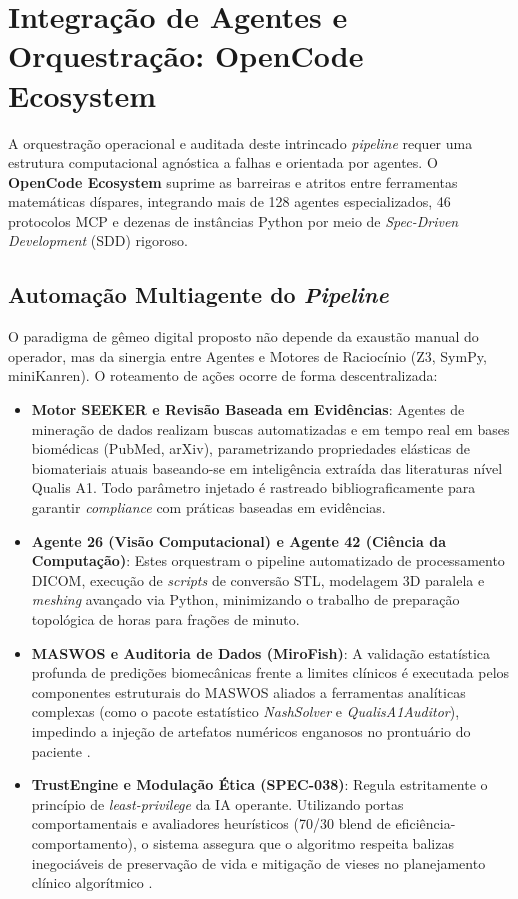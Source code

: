 \section{Integração de Agentes e Orquestração: OpenCode Ecosystem}
\label{sec:integracao}

A orquestração operacional e auditada deste intrincado \textit{pipeline} requer uma estrutura computacional agnóstica a falhas e orientada por agentes. O \textbf{OpenCode Ecosystem} suprime as barreiras e atritos entre ferramentas matemáticas díspares, integrando mais de 128 agentes especializados, 46 protocolos MCP e dezenas de instâncias Python por meio de \textit{Spec-Driven Development} (SDD) rigoroso.

\subsection{Automação Multiagente do \textit{Pipeline}}
\label{subsec:pipeline-auto}

O paradigma de gêmeo digital proposto não depende da exaustão manual do operador, mas da sinergia entre Agentes e Motores de Raciocínio (Z3, SymPy, miniKanren). O roteamento de ações ocorre de forma descentralizada:
\begin{itemize}
    \item \textbf{Motor SEEKER e Revisão Baseada em Evidências}: Agentes de mineração de dados realizam buscas automatizadas e em tempo real em bases biomédicas (PubMed, arXiv), parametrizando propriedades elásticas de biomateriais atuais baseando-se em inteligência extraída das literaturas nível Qualis A1. Todo parâmetro injetado é rastreado bibliograficamente para garantir \textit{compliance} com práticas baseadas em evidências.
    \item \textbf{Agente 26 (Visão Computacional) e Agente 42 (Ciência da Computação)}: Estes orquestram o pipeline automatizado de processamento DICOM, execução de \textit{scripts} de conversão STL, modelagem 3D paralela e \textit{meshing} avançado via Python, minimizando o trabalho de preparação topológica de horas para frações de minuto.
    \item \textbf{MASWOS e Auditoria de Dados (MiroFish)}: A validação estatística profunda de predições biomecânicas frente a limites clínicos é executada pelos componentes estruturais do MASWOS aliados a ferramentas analíticas complexas (como o pacote estatístico \textit{NashSolver} e \textit{QualisA1Auditor}), impedindo a injeção de artefatos numéricos enganosos no prontuário do paciente \cite{techsoc2025towards}.
    \item \textbf{TrustEngine e Modulação Ética (SPEC-038)}: Regula estritamente o princípio de \textit{least-privilege} da IA operante. Utilizando portas comportamentais e avaliadores heurísticos (70/30 blend de eficiência-comportamento), o sistema assegura que o algoritmo respeita balizas inegociáveis de preservação de vida e mitigação de vieses no planejamento clínico algorítmico \cite{katsoulakis2024digital}.
\end{itemize}


